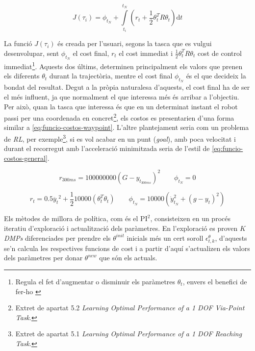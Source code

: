 \documentclass[12pt,a4paper,final,twoside]{report}
\begin{document}
\begin{equation}\label{eq:PI2-cost-function}
J(\tau_i) = \phi_{t_N} + \int\limits_{t_i}^{t_N} (r_t + \frac{1}{2} \theta_t^T R \theta_t) \mathrm{d}t
\end{equation}

La funció $J(\tau_i)$ és creada per l'usuari, segons la tasca que es vulgui desenvolupar, sent $\phi_{t_N}$ el cost final, $r_t$ el cost immediat i $\frac{1}{2} \theta_t^T R \theta_t$ cost de control immediat\footnote{Regula el fet d'augmentar o disminuir els paràmetres $\theta_t$, envers el benefici de fer-ho \cite{Hennig2011}}. Aquests dos últims, determinen principalment els valors que prenen els diferents $\theta_t$ durant la trajectòria, mentre el cost final $\phi_{t_N}$ és el que decideix la bondat del resultat. Degut a la pròpia naturalesa d'aquests, el cost final ha de ser el més influent, ja que normalment el que interessa més és arribar a l'objectiu. Per això, quan la tasca que interessa és que en un determinat instant el robot passi per una coordenada en concret\footnote{Extret de \cite{Schaal2010} apartat 5.2 \textit{Learning Optimal Performance of a 1 DOF Via-Point Task}.}, els costos es presentarien d'una forma similar a \eqref{eq:funcio-costos-waypoint}. L'altre plantejament seria com un problema de \textit{RL}, per exemple\footnote{Extret de \cite{Schaal2010} apartat 5.1 \textit{Learning Optimal Performance of a 1 DOF Reaching Task}.}, si es vol acabar en un punt (\textit{goal}), amb poca velocitat i durant el recorregut amb l'acceleració minimitzada seria de l'estil de \eqref{eq:funcio-costos-general}.

\begin{equation}
r_{300ms} = 100000000(G-y_{t_{300ms}})^2    \qquad {}  \phi_{t_N} = 0\label{eq:funcio-costos-waypoint}
\end{equation}

\begin{equation}
r_t = 0.5\ddot{y_t}^2 + \frac{1}{2}10000( \theta_t^T \theta_t)    \qquad {}  \phi_{t_N} = 10000(\dot{y}_{t_N}^2 + (g-y_t)^2)\label{eq:funcio-costos-general}
\end{equation}

Els mètodes de millora de política, com és el $\mathrm{PI^2}$, consisteixen en un procés iteratiu d'exploració i actualització dels paràmetres. En l'exploració es proven $K$ \textit{DMPs} diferenciades per prendre els $\theta^{init}$ inicials més un cert soroll $\epsilon_{t,k}^{\theta}$, d'aquests se'n calcula les respectives funcions de cost i a partir d'aquí s'actualizen els valors dels paràmetres per donar $\theta^{new}$ que són els actuals.
\end{document}
